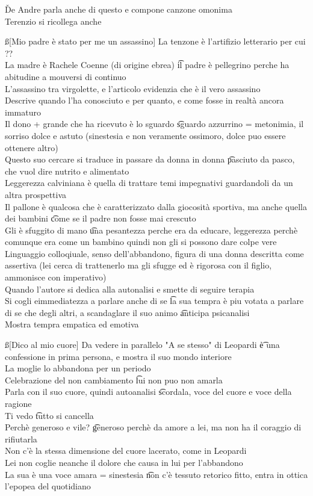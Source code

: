 \documentclass[12pt]{article}
\begin{document}
\v

De Andre parla anche di questo e compone canzone omonima \\
Terenzio si ricollega anche

\ss[Mio padre è stato per me un assassino]
La tenzone è l'artifizio letterario per cui ?? \\
La madre è Rachele Coenne (di origine ebrea) \t il padre è pellegrino perche ha abitudine a mouversi di continuo \\
L'assassino tra virgolette, e l'articolo evidenzia che è il vero assassino \\
Descrive quando l'ha conosciuto e per quanto, e come fosse in realtà ancora immaturo \\
Il dono + grande che ha ricevuto è lo sguardo \t sguardo azzurrino = metonimia, il sorriso dolce e astuto (sinestesia e non veramente ossimoro, dolce puo essere ottenere altro) \\
Questo suo cercare si traduce in passare da donna in donna \t pasciuto da pasco, che vuol dire nutrito e alimentato \\
Leggerezza calviniana è quella di trattare temi impegnativi guardandoli da un altra prospettiva \\
Il pallone è qualcosa che è caratterizzato dalla giocosità sportiva, ma anche quella dei bambini \t come se il padre non fosse mai crescuto \\
Gli è sfuggito di mano \t una pesantezza perche era da educare, leggerezza perchè comunque era come un bambino quindi non gli si possono dare colpe vere \\
Linguaggio colloqiuale, senso dell'abbandono, figura di una donna descritta come assertiva (lei cerca di trattenerlo ma gli sfugge ed è rigorosa con il figlio, ammonisce con imperativo) \\
Quando l'autore si dedica alla autonalisi e smette di seguire terapia \\
Si cogli eimmediatezza a parlare anche di se \t la sua tempra è piu votata a parlare di se che degli altri, a scandaglare il suo animo \t anticipa psicanalisi \\
Mostra tempra empatica ed emotiva

\ss[Dico al mio cuore]
Da vedere in parallelo "A se stesso" di Leopardi \t è una confessione in prima persona, e mostra il suo mondo interiore \\
La moglie lo abbandona per un periodo \\
Celebrazione del non cambiamento \t lui non puo non amarla \\
Parla con il suo cuore, quindi autoanalisi \t scordala, voce del cuore e voce della ragione \\
Ti vedo \t tutto si cancella \\
Perchè generoso e vile? \t generoso perchè da amore a lei, ma non ha il coraggio di rifiutarla \\
Non c'è la stessa dimensione del cuore lacerato, come in Leopardi \\
Lei non coglie neanche il dolore che causa in lui per l'abbandono \\
La sua è una voce amara = sinestesia \t non c'è tessuto retorico fitto, entra in ottica l'epopea del quotidiano
\end{document}
